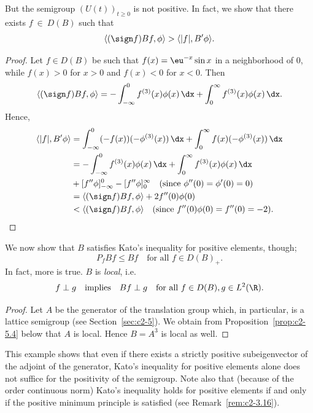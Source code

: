 But the semigroup $(U(t))_{t \geq 0}$ is not positive. 
In fact, we show that there exists $f~\in~D(B)$ such that
\begin{equation}\label{eq:c2-3.19}
\langle(\sign  f)Bf,\phi\rangle > \langle|f|,B'\phi\rangle.
\end{equation}
\begin{proof}
Let $f \in D(B)$ be such that $f(x) = \eu^{-x} \sin x$ in a neighborhood of\/ $0$, while $f(x) > 0$ for $x > 0$ and $f(x) < 0$ for $x < 0$. 
Then
\begin{align*}
\langle(\sign  f)Bf,\phi\rangle = - \int_{-\infty}^{0} f^{(3)}(x)\phi(x) \, \dx + \int_{0}^{\infty} f^{(3)}(x)\phi(x) \, \dx.
\end{align*}
Hence, 
\begin{align*}
\langle|f|,B'\phi\rangle &= \int_{-\infty}^{0} (-f(x))(-\phi^{(3)}(x)) \, \dx + \int_{0}^{\infty} f(x)(-\phi^{(3)}(x)) \, \dx\\
&= - \int_{-\infty}^{0} f^{(3)}(x)\phi(x) \, \dx + \int_{0}^{\infty} f^{(3)}(x)\phi(x) \, \dx\\
&+ [f''\phi]_{-\infty}^{0} - [f''\phi]_{0}^{\infty} \quad \text{(since $\phi''(0)=\phi'(0)=0$)}\\
&= \langle(\sign  f) Bf,\phi\rangle + 2f''(0)\phi(0)\\
&< \langle(\sign  f) Bf,\phi\rangle \quad \text{(since $f''(0)\phi(0) = f''(0) = -2$)}.
\end{align*}
\phantom{x}
\end{proof}
We now show that $B$ satisfies Kato's inequality for positive elements, though; \ie
\begin{equation}\label{eq:c2-3.20}
P_{f} Bf \leq Bf \quad \text{for all } f \in D(B)_{+}.
\end{equation}
In fact, more is true. $B$ is \emph{local}, i.e.
\begin{equation}\label{eq:c2-3.21}
f \perp g \quad \text{implies} \quad Bf \perp g \quad \text{for all } f \in D(B), g \in L^{2}(\R).
\end{equation}
\begin{proof}
Let $A$ be the generator of the translation group which, in particular, is a lattice semigroup (see Section~\ref{sec:c2-5}). 
We obtain from Proposition~\ref{prop:c2-5.4} below that $A$ is local. 
Hence $B = A^{3}$ is local as well.
\end{proof}
This example shows that even if there exists a strictly positive subeigenvector of the adjoint of the generator, Kato's inequality for positive elements alone does not suffice for the positivity of the semigroup. 
Note also that (because of the order continuous norm) Kato's inequality holds for positive elements if and only if the positive minimum principle is satisfied (see Remark~\ref{rem:c2-3.16}).
